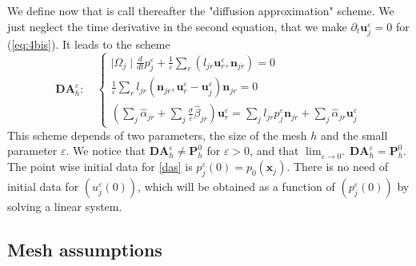\documentclass[a4paper,french,english,10pt]{article}
\newcommand\ljr{l_{jr}}
\newcommand\njr{\mathbf{n}_{jr}}
\newcommand\uu{\mathbf{u}}
\newcommand\eps{\varepsilon}
\newcommand\alj{\widehat{\alpha}_{jr}}
\newcommand\bej{\widehat{\beta}_{jr}}
\newcommand\uj{\uu_j}
\newcommand\ur{\uu_r}
\begin{document}
We define now that is  call thereafter the "diffusion approximation" 
scheme.
We just neglect the time derivative
in the second equation, that we make
 $\partial_t\uj^{\eps}=0$ for (\ref{eq:4bis}). It
leads to the scheme
\begin{equation}\label{das}
\mathbf{DA}_h^\eps:
\quad
\left\{ 
\begin{array}{l}
\displaystyle \mid\Omega_{j}\mid\frac{d}{dt} p_{j}^{\eps}+\frac{1}{\varepsilon}
\sum_{r}(l_{jr}\ur^{\eps},\njr)=0\\
\frac{1}{\varepsilon} \sum_{r}l_{jr} (\njr,\uu_r^{\eps} -\uu_j^{\eps})\njr=0\\
\displaystyle \left( \sum_{j}\alj+ 
\sum_{j}\frac{\sigma}{\varepsilon}\bej\right)\ur^{
\eps}= \sum_{j}\ljr
p_j^{\eps}\njr+\sum_j\alj\uj^{\eps}
\end{array}
\right.
\end{equation}
This  scheme depends of
two parameters, the size of the mesh $h$ and the small parameter 
$\eps$.
We notice that
$\mathbf{DA}_h^\eps\neq \mathbf P_h^0$ for $\eps> 0$, and that 
$\lim_{\eps\rightarrow 0^+} \mathbf{DA}_h^\eps = \mathbf P_h^0$.
The point wise  initial data for \eqref{das} is $p_j^{\eps}(0)=p_0(\mathbf{x}_j)$. There is no 
need of initial data for $(u_j^{\eps}(0))$, which will be obtained 
 as a function of $(p_j^{\eps}(0))$ by solving a linear system.

\subsection{Mesh assumptions}
\end{document}
